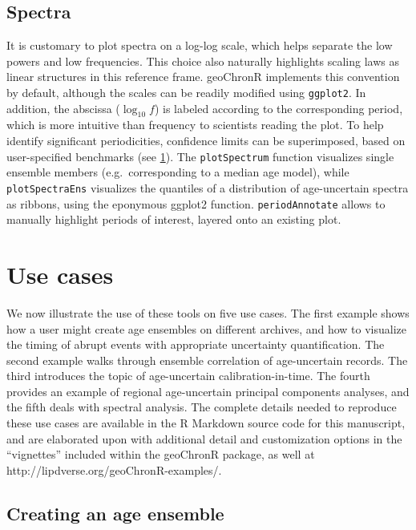 \documentclass[gchron, manuscript]{copernicus}
\begin{document}
\hypertarget{sec:spec_viz}{%
\subsection{Spectra}\label{sec:spec_viz}}

It is customary to plot spectra on a log-log scale, which helps separate the low powers and low frequencies.
This choice also naturally highlights scaling laws \citep{lovejoy2013weather, ZhuPNAS2019} as linear structures in this reference frame.
geoChronR implements this convention by default, although the scales can be readily modified using \texttt{ggplot2}.
In addition, the abscissa (\(\log_{10} f\)) is labeled according to the corresponding period, which is more intuitive than frequency to scientists reading the plot.
To help identify significant periodicities, confidence limits can be superimposed, based on user-specified benchmarks (see \ref{sec:use-cases}).
The \texttt{plotSpectrum} function visualizes single ensemble members (e.g.~corresponding to a median age model), while \texttt{plotSpectraEns} visualizes the quantiles of a distribution of age-uncertain spectra as ribbons, using the eponymous ggplot2 function.
\texttt{periodAnnotate} allows to manually highlight periods of interest, layered onto an existing plot.

\hypertarget{sec:use-cases}{%
\section{Use cases}\label{sec:use-cases}}

We now illustrate the use of these tools on five use cases.
The first example shows how a user might create age ensembles on different archives, and how to visualize the timing of abrupt events with appropriate uncertainty quantification.
The second example walks through ensemble correlation of age-uncertain records.
The third introduces the topic of age-uncertain calibration-in-time.
The fourth provides an example of regional age-uncertain principal components analyses, and the fifth deals with spectral analysis.
The complete details needed to reproduce these use cases are available in the R Markdown source code for this manuscript, and are elaborated upon with additional detail and customization options in the ``vignettes'' included within the geoChronR package, as well at http://lipdverse.org/geoChronR-examples/.

\hypertarget{sec:create_age}{%
\subsection{Creating an age ensemble}\label{sec:create_age}}
\end{document}
